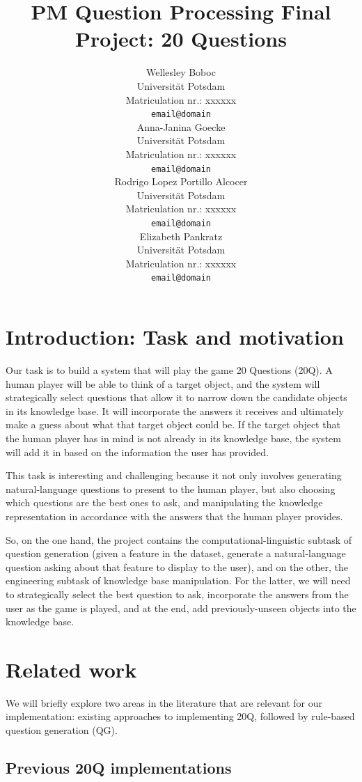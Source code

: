 \documentclass[11pt,a4paper]{article}
\title{PM Question Processing Final Project: 20 Questions}
\author{Wellesley Boboc \\
Universit{\"a}t Potsdam \\
Matriculation nr.: xxxxxx \\
\texttt{email@domain} \\\And
Anna-Janina Goecke \\
Universit{\"a}t Potsdam \\
Matriculation nr.: xxxxxx \\
\texttt{email@domain} \\\AND
Rodrigo Lopez Portillo Alcocer \\
Universit{\"a}t Potsdam \\
Matriculation nr.: xxxxxx \\
\texttt{email@domain} \\\And
Elizabeth Pankratz \\
Universit{\"a}t Potsdam \\
Matriculation nr.: xxxxxx \\
\texttt{email@domain} \\}
\date{}
\begin{document}
\maketitle

\begin{abstract}
\lipsum[1]
\end{abstract}

\section{Introduction: Task and motivation}

Our task is to build a system that will play the game 20 Questions (20Q).
A human player will be able to think of a target object, and the system will strategically select questions that allow it to narrow down the candidate objects in its knowledge base.
It will incorporate the answers it receives and ultimately make a guess about what that target object could be.
If the target object that the human player has in mind is not already in its knowledge base, the system will add it in based on the information the user has provided.

This task is interesting and challenging because it not only involves generating natural-language questions to present to the human player, but also choosing which questions are the best ones to ask, and manipulating the knowledge representation in accordance with the answers that the human player provides.

So, on the one hand, the project contains the computational-linguistic subtask of question generation (given a feature in the dataset, generate a natural-language question asking about that feature to display to the user), and on the other, the engineering subtask of knowledge base manipulation.
For the latter, we will need to strategically select the best question to ask, incorporate the answers from the user as the game is played, and at the end, add previously-unseen objects into the knowledge base.

\section{Related work}

We will briefly explore two areas in the literature that are relevant for our implementation: existing approaches to implementing 20Q, followed by rule-based question generation (QG).

\subsection{Previous 20Q implementations}
\end{document}
